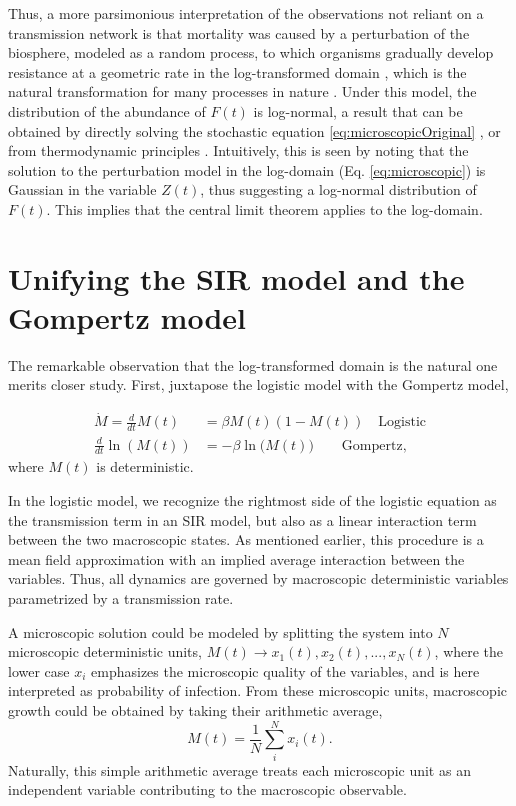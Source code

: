 \documentclass[sn-mathphys]{sn-jnl}%
\theoremstyle{thmstyleone}%
\theoremstyle{thmstyletwo}%
\theoremstyle{thmstylethree}%
\begin{document}
Thus, a more parsimonious interpretation of the observations not reliant on a transmission network is that mortality was caused by a perturbation of the biosphere, modeled as a random process, to which organisms gradually develop resistance at a geometric rate in the log-transformed domain \cite{boxenbaum2017hypotheses,neafsey1988gompertz}, which is the natural transformation for many processes in nature \cite{zhang1994log}. 
Under this model, the distribution of the abundance of $F(t)$ is log-normal, a result that can be obtained by directly solving the stochastic equation \ref{eq:microscopicOriginal} \cite{skiadas2010exact,petroni2020gompertz}, or from thermodynamic principles \cite{sitaram1984statistical,gunasekaran1982lon,chakrabarti1996non}. 
Intuitively, this is seen by noting that the solution to the perturbation model in the log-domain (Eq. \ref{eq:microscopic}) is Gaussian in the variable $Z(t)$, thus suggesting a log-normal distribution of $F(t)$. This implies that the central limit theorem applies to the log-domain.

\section*{Unifying the SIR model and the Gompertz model}
The remarkable observation that the log-transformed domain is the natural one merits closer study. First, juxtapose the logistic model with the Gompertz model,

\begin{subequations}
\begin{align}
\dot{M} = \frac{d}{dt}M(t) & = \beta M(t) (1-M(t)) \quad \text{Logistic}\label{eq:compareLog}\\ 
\frac{d}{dt}\ln{(M(t))} & = -\beta \ln{(M(t)}) \quad\quad\text{Gompertz}\label{eq:compareGom},
\end{align}
\end{subequations}
where $M(t)$ is deterministic. 

In the logistic model, we recognize the rightmost side of the logistic equation as the transmission term in an SIR model, but also as a linear interaction term between the two macroscopic states. 
As mentioned earlier, this procedure is a mean field approximation with an implied average interaction between the variables. 
Thus, all dynamics are governed by macroscopic deterministic variables parametrized by a transmission rate.

A microscopic solution could be modeled by splitting the system into $N$ microscopic deterministic units, $M(t) \rightarrow x_1(t), x_2(t), ..., x_N(t)$, where the lower case $x_i$ emphasizes the microscopic quality of the variables, and is here interpreted as probability of infection. From these microscopic units, macroscopic growth could be obtained by taking their arithmetic average,
\begin{equation}
M(t) = \frac{1}{N}\sum_i^N x_i(t).
\end{equation}
Naturally, this simple arithmetic average treats each microscopic unit as an independent variable contributing to the macroscopic observable.
\end{document}
